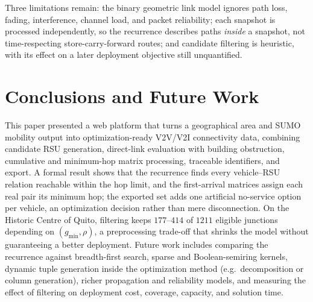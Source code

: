 \documentclass[engproc,proceedingpaper,submit,oneauthor]{Definitions/mdpi}
\begin{document}
Three limitations remain: the binary geometric link model ignores path loss, fading,
interference, channel load, and packet reliability; each snapshot is processed
independently, so the recurrence describes paths \emph{inside} a snapshot, not
time-respecting store-carry-forward routes; and candidate filtering is heuristic, with
its effect on a later deployment objective still unquantified.

\section{Conclusions and Future Work}\label{sec:conclusions}

This paper presented a web platform that turns a geographical area and SUMO mobility
output into optimization-ready V2V/V2I connectivity data, combining candidate RSU
generation, direct-link evaluation with building obstruction, cumulative and
minimum-hop matrix processing, traceable identifiers, and export. A formal result
shows that the recurrence finds every vehicle--RSU relation reachable within the hop
limit, and the first-arrival matrices assign each real pair its minimum hop; the
exported set adds one artificial no-service option per vehicle, an optimization
decision rather than mere disconnection. On the Historic Centre of Quito, filtering
keeps $177$--$414$ of $1211$ eligible junctions depending on $(g_{\min},\rho)$, a
preprocessing trade-off that shrinks the model without guaranteeing a better
deployment. Future work includes comparing the recurrence against breadth-first search,
sparse and Boolean-semiring kernels, dynamic tuple generation inside the optimization
method (e.g.\ decomposition or column generation), richer propagation and reliability
models, and measuring the effect of filtering on deployment cost, coverage, capacity,
and solution time.



\end{document}
